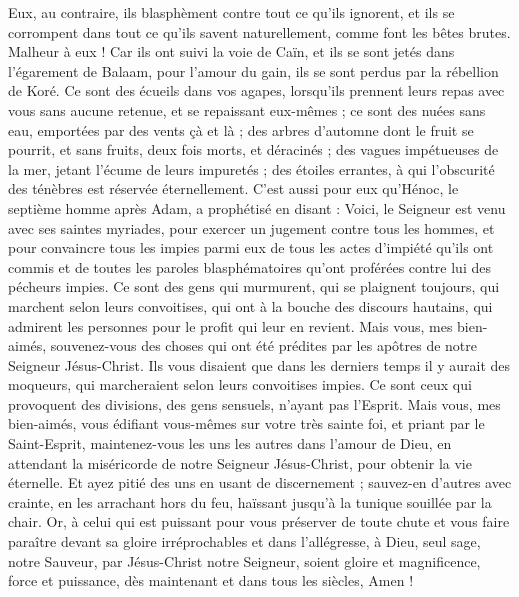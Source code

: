 \begin{multicols}{2}
Eux, au contraire, ils blasphèment contre tout ce qu'ils ignorent, et ils se corrompent dans tout ce qu'ils savent naturellement, comme font les bêtes brutes.
Malheur à eux ! Car ils ont suivi la voie de Caïn, et ils se sont jetés dans l’égarement de Balaam, pour l’amour du gain, ils se sont perdus par la rébellion de Koré{}.
Ce sont des écueils dans vos agapes, lorsqu’ils prennent leurs repas avec vous sans aucune retenue, et se repaissant eux-mêmes ; ce sont des nuées sans eau, emportées par des vents çà et là ; des arbres d’automne dont le fruit se pourrit, et sans fruits, deux fois morts, et déracinés ;
des vagues impétueuses de la mer, jetant l'écume de leurs impuretés ; des étoiles errantes, à qui l'obscurité des ténèbres est réservée éternellement.
C’est aussi pour eux qu’Hénoc, le septième homme après Adam, a prophétisé en disant :
Voici, le Seigneur est venu avec ses saintes myriades, pour exercer un jugement contre tous les hommes, et pour convaincre tous les impies parmi eux de tous les actes d'impiété qu’ils ont commis et de toutes les paroles blasphématoires qu’ont proférées contre lui des pécheurs impies.
Ce sont des gens qui murmurent, qui se plaignent toujours, qui marchent selon leurs convoitises, qui ont à la bouche des discours hautains, qui admirent les personnes pour le profit qui leur en revient.
Mais vous, mes bien-aimés, souvenez-vous des choses qui ont été prédites par les apôtres de notre Seigneur Jésus-Christ.
Ils vous disaient que dans les derniers temps il y aurait des moqueurs, qui marcheraient selon leurs convoitises impies.
Ce sont ceux qui provoquent des divisions, des gens sensuels, n'ayant pas l'Esprit.
Mais vous, mes bien-aimés, vous édifiant vous-mêmes sur votre très sainte foi, et priant par le Saint-Esprit,
maintenez-vous les uns les autres dans l'amour de Dieu, en attendant la miséricorde de notre Seigneur Jésus-Christ, pour obtenir la vie éternelle.
Et ayez pitié des uns en usant de discernement ;
sauvez-en d’autres avec crainte, en les arrachant hors du feu, haïssant jusqu’à la tunique souillée par la chair.
\TextTitle{[Conclusion]}
Or, à celui qui est puissant pour vous préserver de toute chute et vous faire paraître devant sa gloire irréprochables et dans l’allégresse,
à Dieu, seul sage, notre Sauveur, par Jésus-Christ notre Seigneur, soient gloire et magnificence, force et puissance, dès maintenant et dans tous les siècles, Amen !
\PPE{}
\end{multicols}
